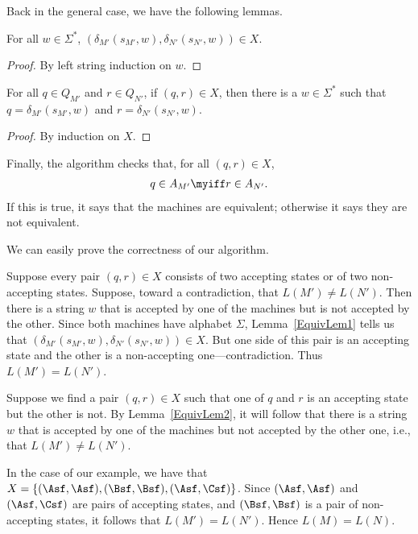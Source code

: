Back in the general case, we have the following lemmas.

\begin{lemma}
\label{EquivLem1}
For all $w\in\Sigma^*$, $(\delta_{M'}(s_{M'},w),\delta_{N'}(s_{N'},w))\in X$.
\end{lemma}

\begin{proof}
By left string induction on $w$.
\end{proof}

\begin{lemma}
\label{EquivLem2}
For all $q\in Q_{M'}$ and $r\in Q_{N'}$, if $(q,r)\in X$, then there
is a $w\in\Sigma^*$ such that $q=\delta_{M'}(s_{M'},w)$ and
$r=\delta_{N'}(s_{N'},w)$.
\end{lemma}

\begin{proof}
By induction on $X$.
\end{proof}

Finally, the algorithm checks that, for all $(q,r)\in X$,
\begin{gather*}
q\in A_{M'}\myiff r\in A_{N'} .
\end{gather*}
If this is true, it says that the machines are equivalent; otherwise
it says they are not equivalent.

We can easily prove the correctness of our algorithm.

Suppose every pair $(q,r)\in X$ consists of two accepting states or
of two non-accepting states.  Suppose, toward a contradiction, that
$L(M')\neq L(N')$.  Then there is a string $w$ that is accepted by
one of the machines but is not accepted by the other.  Since both
machines have alphabet $\Sigma$, Lemma~\ref{EquivLem1} tells
us that $(\delta_{M'}(s_{M'},w),\delta_{N'}(s_{N'},w))\in X$.
But one side of this pair is an accepting state and the other is
a non-accepting one---contradiction.  Thus $L(M')=L(N')$.

Suppose we find a pair $(q,r)\in X$ such that one of $q$ and $r$
is an accepting state but the other is not.  By Lemma~\ref{EquivLem2},
it will follow that there is a string $w$ that is accepted by one of
the machines but not accepted by the other one, i.e., that $L(M')\neq L(N')$.

In the case of our example, we have that
$X=\{(\Asf,\Asf), (\Bsf,\Bsf), (\Asf,\Csf)\}$.
Since $(\Asf,\Asf)$ and $(\Asf,\Csf)$ are pairs of accepting states,
and $(\Bsf,\Bsf)$ is a pair of non-accepting states, it follows
that $L(M')=L(N')$.  Hence $L(M)=L(N)$.

